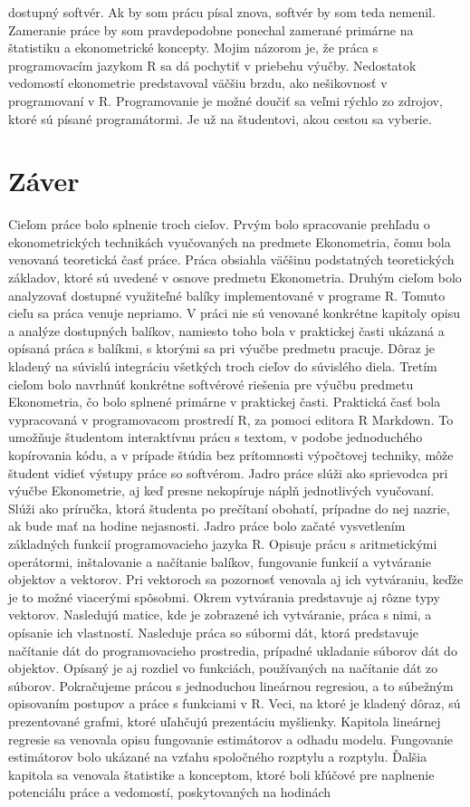 \documentclass[]{tukediphc}
\begin{document}
dostupný softvér. Ak by som prácu písal znova, softvér by som teda nemenil. Zameranie práce by som pravdepodobne ponechal zamerané primárne na štatistiku a ekonometrické koncepty. Mojim názorom je, že práca s programovacím jazykom R sa dá pochytiť v priebehu výučby. Nedostatok vedomostí ekonometrie predstavoval väčšiu brzdu, ako nešikovnosť v programovaní v R. Programovanie je možné doučiť sa veľmi rýchlo zo zdrojov, ktoré sú písané programátormi. Je už na študentovi, akou cestou sa vyberie.

\newpage
{}
\section*{Záver}

Cieľom práce bolo splnenie troch cieľov. Prvým bolo spracovanie prehľadu o ekonometrických technikách vyučovaných na predmete Ekonometria, čomu bola venovaná teoretická časť práce. Práca obsiahla väčšinu podstatných teoretických základov, ktoré sú uvedené v osnove predmetu Ekonometria. Druhým cieľom bolo analyzovať dostupné využiteľné balíky implementované v programe R. Tomuto cieľu sa práca venuje nepriamo. V práci nie sú venované konkrétne kapitoly opisu a analýze dostupných balíkov, namiesto toho bola v praktickej časti ukázaná a opísaná práca s balíkmi, s ktorými sa pri výučbe predmetu pracuje. Dôraz je kladený na súvislú integráciu všetkých troch cieľov do súvislého diela. Tretím cieľom bolo navrhnúť konkrétne softvérové riešenia pre výučbu predmetu Ekonometria, čo bolo splnené primárne v praktickej časti. Praktická časť bola vypracovaná v programovacom prostredí R, za pomoci editora R Markdown. To umožňuje študentom interaktívnu prácu s textom, v podobe jednoduchého kopírovania kódu, a v prípade štúdia bez prítomnosti výpočtovej techniky, môže študent vidieť výstupy práce so softvérom. Jadro práce slúži ako sprievodca pri výučbe Ekonometrie, aj keď presne nekopíruje náplň jednotlivých vyučovaní. Slúži ako príručka, ktorá študenta po prečítaní obohatí, prípadne do nej nazrie, ak bude mať na hodine nejasnosti. Jadro práce bolo začaté vysvetlením základných funkcií programovacieho jazyka R. Opisuje prácu s aritmetickými operátormi, inštalovanie a načítanie balíkov, fungovanie funkcií a vytváranie objektov a vektorov. Pri vektoroch sa pozornosť venovala aj ich vytváraniu, keďže je to možné viacerými spôsobmi. Okrem vytvárania predstavuje aj rôzne typy vektorov. Nasledujú matice, kde je zobrazené ich vytváranie, práca s nimi, a opísanie ich vlastností. Nasleduje práca so súbormi dát, ktorá predstavuje načítanie dát do programovacieho prostredia, prípadné ukladanie súborov dát do objektov. Opísaný je aj rozdiel vo funkciách, používaných na načítanie dát zo súborov. Pokračujeme prácou s jednoduchou lineárnou regresiou, a to súbežným opisovaním postupov a práce s funkciami v R. Veci, na ktoré je kladený dôraz, sú prezentované grafmi, ktoré uľahčujú prezentáciu myšlienky. Kapitola lineárnej regresie sa venovala opisu fungovanie estimátorov a odhadu modelu. Fungovanie estimátorov bolo ukázané na vzťahu spoločného rozptylu a rozptylu. Ďalšia kapitola sa venovala štatistike a konceptom, ktoré boli kľúčové pre naplnenie potenciálu práce a vedomostí, poskytovaných na hodinách 
\end{document}
